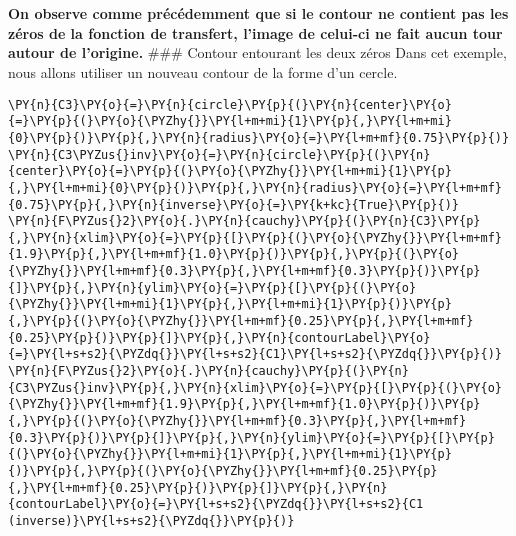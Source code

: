     \begin{center}
    \end{center}
    { \hspace*{\fill} \\}
    
    \begin{center}
    \end{center}
    { \hspace*{\fill} \\}
    
    \textbf{On observe comme précédemment que si le contour ne contient pas
les zéros de la fonction de transfert, l'image de celui-ci ne fait aucun
tour autour de l'origine.} \#\#\# Contour entourant les deux zéros Dans
cet exemple, nous allons utiliser un nouveau contour de la forme d'un
cercle.

    \begin{tcolorbox}[breakable, size=fbox, boxrule=1pt, pad at break*=1mm,colback=cellbackground, colframe=cellborder]
\begin{Verbatim}[commandchars=\\\{\}]
\PY{n}{C3}\PY{o}{=}\PY{n}{circle}\PY{p}{(}\PY{n}{center}\PY{o}{=}\PY{p}{(}\PY{o}{\PYZhy{}}\PY{l+m+mi}{1}\PY{p}{,}\PY{l+m+mi}{0}\PY{p}{)}\PY{p}{,}\PY{n}{radius}\PY{o}{=}\PY{l+m+mf}{0.75}\PY{p}{)}
\PY{n}{C3\PYZus{}inv}\PY{o}{=}\PY{n}{circle}\PY{p}{(}\PY{n}{center}\PY{o}{=}\PY{p}{(}\PY{o}{\PYZhy{}}\PY{l+m+mi}{1}\PY{p}{,}\PY{l+m+mi}{0}\PY{p}{)}\PY{p}{,}\PY{n}{radius}\PY{o}{=}\PY{l+m+mf}{0.75}\PY{p}{,}\PY{n}{inverse}\PY{o}{=}\PY{k+kc}{True}\PY{p}{)}
\PY{n}{F\PYZus{}2}\PY{o}{.}\PY{n}{cauchy}\PY{p}{(}\PY{n}{C3}\PY{p}{,}\PY{n}{xlim}\PY{o}{=}\PY{p}{[}\PY{p}{(}\PY{o}{\PYZhy{}}\PY{l+m+mf}{1.9}\PY{p}{,}\PY{l+m+mf}{1.0}\PY{p}{)}\PY{p}{,}\PY{p}{(}\PY{o}{\PYZhy{}}\PY{l+m+mf}{0.3}\PY{p}{,}\PY{l+m+mf}{0.3}\PY{p}{)}\PY{p}{]}\PY{p}{,}\PY{n}{ylim}\PY{o}{=}\PY{p}{[}\PY{p}{(}\PY{o}{\PYZhy{}}\PY{l+m+mi}{1}\PY{p}{,}\PY{l+m+mi}{1}\PY{p}{)}\PY{p}{,}\PY{p}{(}\PY{o}{\PYZhy{}}\PY{l+m+mf}{0.25}\PY{p}{,}\PY{l+m+mf}{0.25}\PY{p}{)}\PY{p}{]}\PY{p}{,}\PY{n}{contourLabel}\PY{o}{=}\PY{l+s+s2}{\PYZdq{}}\PY{l+s+s2}{C1}\PY{l+s+s2}{\PYZdq{}}\PY{p}{)}
\PY{n}{F\PYZus{}2}\PY{o}{.}\PY{n}{cauchy}\PY{p}{(}\PY{n}{C3\PYZus{}inv}\PY{p}{,}\PY{n}{xlim}\PY{o}{=}\PY{p}{[}\PY{p}{(}\PY{o}{\PYZhy{}}\PY{l+m+mf}{1.9}\PY{p}{,}\PY{l+m+mf}{1.0}\PY{p}{)}\PY{p}{,}\PY{p}{(}\PY{o}{\PYZhy{}}\PY{l+m+mf}{0.3}\PY{p}{,}\PY{l+m+mf}{0.3}\PY{p}{)}\PY{p}{]}\PY{p}{,}\PY{n}{ylim}\PY{o}{=}\PY{p}{[}\PY{p}{(}\PY{o}{\PYZhy{}}\PY{l+m+mi}{1}\PY{p}{,}\PY{l+m+mi}{1}\PY{p}{)}\PY{p}{,}\PY{p}{(}\PY{o}{\PYZhy{}}\PY{l+m+mf}{0.25}\PY{p}{,}\PY{l+m+mf}{0.25}\PY{p}{)}\PY{p}{]}\PY{p}{,}\PY{n}{contourLabel}\PY{o}{=}\PY{l+s+s2}{\PYZdq{}}\PY{l+s+s2}{C1 (inverse)}\PY{l+s+s2}{\PYZdq{}}\PY{p}{)}
\end{Verbatim}
\end{tcolorbox}

